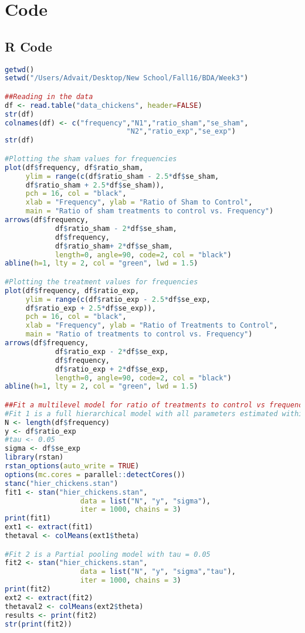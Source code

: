 \documentclass{article}
\begin{document}
\section{Code}
\subsection{R Code}
\begin{lstlisting}[language=R]
getwd()
setwd("/Users/Advait/Desktop/New School/Fall16/BDA/Week3")

##Reading in the data
df <- read.table("data_chickens", header=FALSE)
str(df)
colnames(df) <- c("frequency","N1","ratio_sham","se_sham",
                             "N2","ratio_exp","se_exp")
str(df)

#Plotting the sham values for frequencies
plot(df$frequency, df$ratio_sham,
     ylim = range(c(df$ratio_sham - 2.5*df$se_sham, 
     df$ratio_sham + 2.5*df$se_sham)),
     pch = 16, col = "black", 
     xlab = "Frequency", ylab = "Ratio of Sham to Control",
     main = "Ratio of sham treatments to control vs. Frequency")
arrows(df$frequency, 
            df$ratio_sham - 2*df$se_sham, 
            df$frequency, 
            df$ratio_sham+ 2*df$se_sham, 
            length=0, angle=90, code=2, col = "black")
abline(h=1, lty = 2, col = "green", lwd = 1.5)

#Plotting the treatment values for frequencies
plot(df$frequency, df$ratio_exp,
     ylim = range(c(df$ratio_exp - 2.5*df$se_exp, 
     df$ratio_exp + 2.5*df$se_exp)),
     pch = 16, col = "black", 
     xlab = "Frequency", ylab = "Ratio of Treatments to Control",
     main = "Ratio of treatments to control vs. Frequency")
arrows(df$frequency, 
            df$ratio_exp - 2*df$se_exp, 
            df$frequency, 
            df$ratio_exp + 2*df$se_exp, 
            length=0, angle=90, code=2, col = "black")
abline(h=1, lty = 2, col = "green", lwd = 1.5)

##Fit a multilevel model for ratio of treatments to control vs frequency
#Fit 1 is a full hierarchical model with all parameters estimated within the model
N <- length(df$frequency)
y <- df$ratio_exp
#tau <- 0.05 
sigma <- df$se_exp
library(rstan)
rstan_options(auto_write = TRUE)
options(mc.cores = parallel::detectCores())
stanc("hier_chickens.stan")
fit1 <- stan("hier_chickens.stan", 
                  data = list("N", "y", "sigma"), 
                  iter = 1000, chains = 3)
print(fit1)
ext1 <- extract(fit1)
thetaval <- colMeans(ext1$theta)

#Fit 2 is a Partial pooling model with tau = 0.05
fit2 <- stan("hier_chickens.stan", 
                  data = list("N", "y", "sigma","tau"), 
                  iter = 1000, chains = 3)
print(fit2)
ext2 <- extract(fit2)
thetaval2 <- colMeans(ext2$theta)
results <- print(fit2)
str(print(fit2))


\end{lstlisting}
\end{document}
